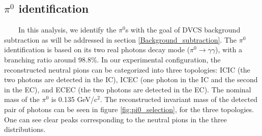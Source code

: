 \subsection{$\pi^{0}$ identification}
~~~~In this analysis, we identify the $\pi^{0}$s with the goal of DVCS background subtraction as will be addressed in section \ref{Background_subtraction}. The $\pi^{0}$ identification is based on its two real photons decay mode ($\pi^{0} \rightarrow \gamma \gamma$), with a branching ratio around 98.8$\%$. In our experimental configuration, the reconstructed neutral pions can be categorized into three topologies: ICIC (the two photons are detected in the IC), ICEC (one photon in the IC and the second in the EC), and ECEC (the two photons are detected in the EC). The nominal mass of the $\pi^{0}$ is 0.135 GeV/c$^{2}$. The reconstructed invariant mass of the detected pair of photons can be seen in figure \ref{fig:pi0_selection}, for the three topologies. One can see clear peaks corresponding to the neutral pions in the three distributions.
